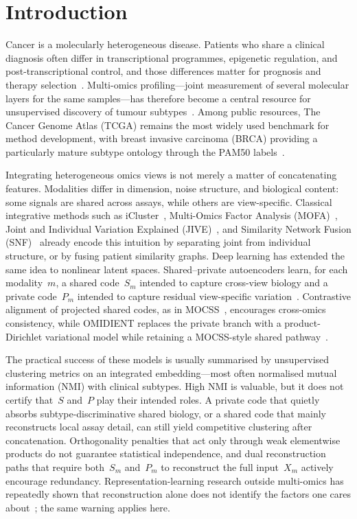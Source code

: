 \section{Introduction}

Cancer is a molecularly heterogeneous disease. Patients who share a clinical diagnosis often differ in transcriptional programmes, epigenetic regulation, and post-transcriptional control, and those differences matter for prognosis and therapy selection~\citep{hasin2017multi,jiang2022big}. Multi-omics profiling---joint measurement of several molecular layers for the same samples---has therefore become a central resource for unsupervised discovery of tumour subtypes~\citep{mohr2024navigating}. Among public resources, The Cancer Genome Atlas (TCGA) remains the most widely used benchmark for method development, with breast invasive carcinoma (BRCA) providing a particularly mature subtype ontology through the PAM50 labels~\citep{parker2009pam50}.

Integrating heterogeneous omics views is not merely a matter of concatenating features. Modalities differ in dimension, noise structure, and biological content: some signals are shared across assays, while others are view-specific. Classical integrative methods such as iCluster~\citep{shen2009integrative}, Multi-Omics Factor Analysis (MOFA)~\citep{argelaguet2018multi}, Joint and Individual Variation Explained (JIVE)~\citep{lock2013jive}, and Similarity Network Fusion (SNF)~\citep{wang2014snf} already encode this intuition by separating joint from individual structure, or by fusing patient similarity graphs. Deep learning has extended the same idea to nonlinear latent spaces. Shared--private autoencoders learn, for each modality~$m$, a shared code~$S_m$ intended to capture cross-view biology and a private code~$P_m$ intended to capture residual view-specific variation~\citep{chen2023mocss,xiao2022multi}. Contrastive alignment of projected shared codes, as in MOCSS~\citep{chen2023mocss}, encourages cross-omics consistency, while OMIDIENT replaces the private branch with a product-Dirichlet variational model while retaining a MOCSS-style shared pathway~\citep{Safinianaini_Välimäki_Bresson_Gorbonos_Rajamäki_Aaltonen_Marttinen_2025}.

The practical success of these models is usually summarised by unsupervised clustering metrics on an integrated embedding---most often normalised mutual information (NMI) with clinical subtypes. High NMI is valuable, but it does not certify that~$S$ and~$P$ play their intended roles. A private code that quietly absorbs subtype-discriminative shared biology, or a shared code that mainly reconstructs local assay detail, can still yield competitive clustering after concatenation. Orthogonality penalties that act only through weak elementwise products do not guarantee statistical independence, and dual reconstruction paths that require both~$S_m$ and~$P_m$ to reconstruct the full input~$X_m$ actively encourage redundancy. Representation-learning research outside multi-omics has repeatedly shown that reconstruction alone does not identify the factors one cares about~\citep{bengio2013representation,Goodfellow-et-al-2016}; the same warning applies here.


